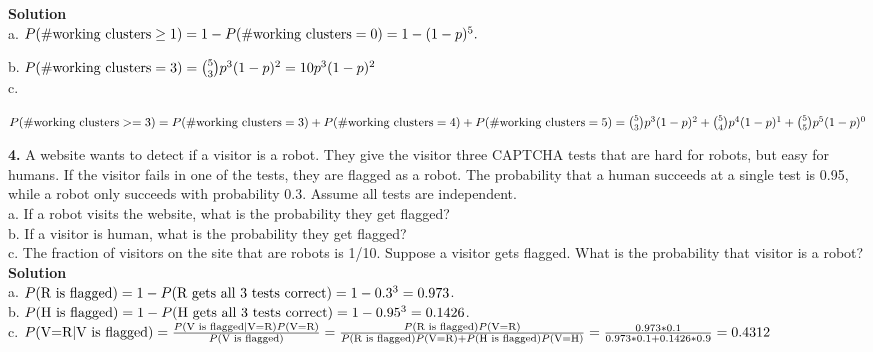 \documentclass[10pt,a4paper,oneside,draft]{report}
\begin{document}
\textbf{Solution} \\

a. $P(\# \textnormal{working clusters} \geq 1) = 1 - P(\# \textnormal{working clusters} = 0) = 1 - (1-p)^5.$

b. $P(\# \textnormal{working clusters} = 3) = {5 \choose 3} {p^3} {(1-p)^2} = 10 {p^3} {(1-p)^2} $\\

c. \begin{center}
$P(\# \textnormal{working clusters} >= 3) =
P(\# \textnormal{working clusters} = 3) + P(\# \textnormal{working clusters} = 4) + P(\# \textnormal{working clusters} = 5) = {5 \choose 3} {p^3} {(1-p)^2} + {5 \choose 4} {p^4} {(1-p)^1} + {5 \choose 5} {p^5} {(1-p)^0} $
\end{center}

\textbf{4.} A website wants to detect if a visitor is a robot. They give the visitor three CAPTCHA tests that are hard for robots, but easy for humans. If the visitor fails in one of the tests, they are flagged as a robot. The probability that a human succeeds at a single test is 0.95, while a robot only succeeds with probability 0.3. Assume all tests are independent. \\
a. If a robot visits the website, what is the probability they get flagged? \\
b. If a visitor is human, what is the probability they get flagged? \\
c. The fraction of visitors on the site that are robots is 1/10. Suppose a visitor gets flagged. What is the probability that visitor is a robot? \\

\textbf{Solution} \\

a. $P(\textnormal{R is flagged}) = 1 - P(\textnormal{R gets all 3 tests correct}) = 1 - 0.3^3 = 0.973$.\\

b. $P(\textnormal{H is flagged}) = 1 - P(\textnormal{H gets all 3 tests correct}) = 1 - 0.95^3 = 0.1426$.\\

c. $P(\textnormal{V=R}|\textnormal{V is flagged}) = \frac{ {P(\textnormal{V is flagged} | \textnormal{V=R}) P(\textnormal{V=R})} }{ P(\textnormal{V is flagged}) } 
= \\
\frac{ {P(\textnormal{R is flagged}) P(\textnormal{V=R})} }{ {P(\textnormal{R is flagged})P(\textnormal{V=R}) + P(\textnormal{H is flagged})P(\textnormal{V=H})} } 
= \frac{ {0.973 * 0.1} }{ {0.973 * 0.1 + 0.1426 * 0.9} } = 0.4312
$\\
\end{document}

